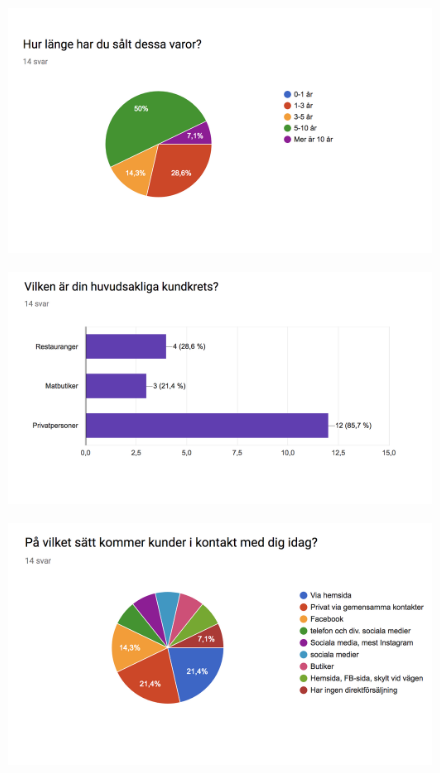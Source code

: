 \documentclass[10pt,a4paper,oneside]{article}
\begin{document}
\begin{figure}[H]
	\includegraphics[scale=0.6]{2.png}
\end{figure}

\begin{figure}[H]
	\includegraphics[scale=0.6]{3.png}
\end{figure}

\begin{figure}[H]
	\includegraphics[scale=0.6]{4.png}
\end{figure}
\end{document}
